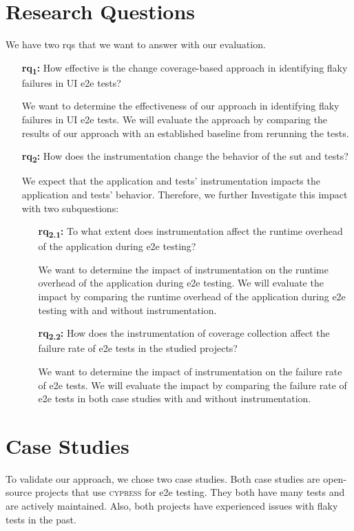 \section{Research Questions}
We have two \acp{rq} that we want to answer with our evaluation.
\begin{enumerate}
	\item[\textbf{\acs{rq}\textsubscript{1}:}] How effective is the change coverage-based approach in identifying flaky failures in UI \ac{e2e} tests?

		We want to determine the effectiveness of our approach in identifying flaky failures in UI \ac{e2e} tests.
		We will evaluate the approach by comparing the results of our approach with an established baseline from rerunning the tests.
	\item[\textbf{\acs{rq}\textsubscript{2}:}] How does the instrumentation change the behavior of the \ac{sut} and tests?

		We expect that the application and tests' instrumentation impacts the application and tests' behavior.
		Therefore, we further Investigate this impact with two subquestions:
		\begin{enumerate}
			\item[\textbf{\acs{rq}\textsubscript{2.1}:}] To what extent does instrumentation affect the runtime overhead of the application during \acs{e2e} testing?

				We want to determine the impact of instrumentation on the runtime overhead of the application during \ac{e2e} testing.
				We will evaluate the impact by comparing the runtime overhead of the application during \ac{e2e} testing with and without instrumentation.
			\item[\textbf{\acs{rq}\textsubscript{2.2}:}] How does the instrumentation of coverage collection affect the failure rate of \ac{e2e} tests in the studied projects?

				We want to determine the impact of instrumentation on the failure rate of \ac{e2e} tests.
				We will evaluate the impact by comparing the failure rate of \ac{e2e} tests in both case studies with and without instrumentation.
		\end{enumerate}
\end{enumerate}

\section{Case Studies}
To validate our approach, we chose two case studies.
Both case studies are open-source projects that use \textsc{cypress} for \ac{e2e} testing.
They both have many tests and are actively maintained.
Also, both projects have experienced issues with flaky tests in the past.

